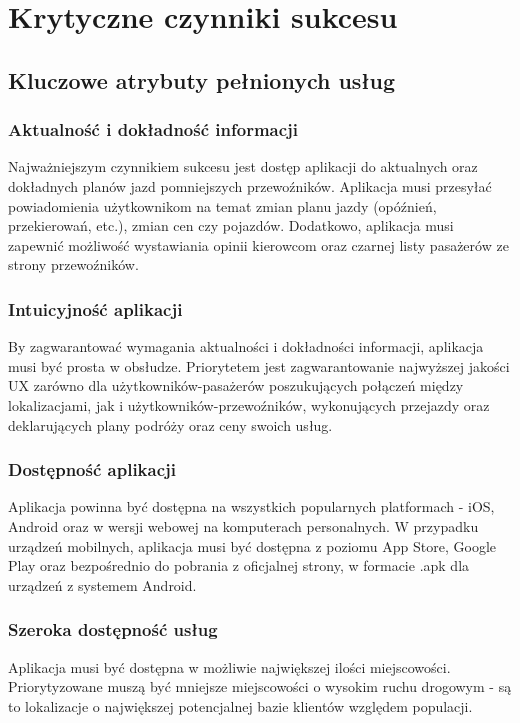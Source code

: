 \chapter{Krytyczne czynniki sukcesu}
\label{chap:trzeci}

\section{Kluczowe atrybuty pełnionych usług}
\subsection{Aktualność i dokładność informacji}
Najważniejszym czynnikiem sukcesu jest dostęp aplikacji do aktualnych oraz dokładnych planów jazd pomniejszych przewoźników. Aplikacja musi przesyłać powiadomienia użytkownikom na temat zmian planu jazdy (opóźnień, przekierowań, etc.), zmian cen czy pojazdów. Dodatkowo, aplikacja musi zapewnić możliwość wystawiania opinii kierowcom oraz czarnej listy pasażerów ze strony przewoźników.

\subsection{Intuicyjność aplikacji}
By zagwarantować wymagania aktualności i dokładności informacji, aplikacja musi być prosta w obsłudze. Priorytetem jest zagwarantowanie najwyższej jakości UX zarówno dla użytkowników-pasażerów poszukujących połączeń między lokalizacjami, jak i użytkowników-przewoźników, wykonujących przejazdy oraz deklarujących plany podróży oraz ceny swoich usług.

\subsection{Dostępność aplikacji}
Aplikacja powinna być dostępna na wszystkich popularnych platformach - iOS, Android oraz w wersji webowej na komputerach personalnych. W przypadku urządzeń mobilnych, aplikacja musi być dostępna z poziomu App Store, Google Play oraz bezpośrednio do pobrania z oficjalnej strony, w formacie .apk dla urządzeń z systemem Android. 

\subsection{Szeroka dostępność usług}
Aplikacja musi być dostępna w możliwie największej ilości miejscowości. Priorytyzowane muszą być mniejsze miejscowości o wysokim ruchu drogowym - są to lokalizacje o największej potencjalnej bazie klientów względem populacji.

